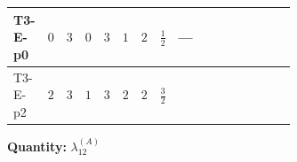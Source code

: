 \documentclass[8pt]{article}
\begin{document}
\begin{landscape}
\begin{longtable}{@{}llcccccc >{\raggedright\arraybackslash}p{0.21\linewidth} >{\raggedright\arraybackslash}p{0.21\linewidth} >{\raggedright\arraybackslash}p{0.21\linewidth}@{}}
\midrule
T3-E-p0 & $0$ & $3$ & $0$ & $3$ & $1$ & $2$ & $\frac{1}{2}$ & --- & \scriptsize\adjustbox{max width=\linewidth}{$\begin{gathered} -24 {g_2}^2 {\lambda_{12}^{(A)}}\end{gathered}$} & \scriptsize\adjustbox{max width=\linewidth}{$\begin{gathered} +8 {\lambda_{12}^{(1)}} {\lambda_{12}^{(A)}}\end{gathered}$} \\
\midrule
T3-E-p2 & $2$ & $3$ & $1$ & $3$ & $2$ & $2$ & $\frac{3}{2}$ & \scriptsize\adjustbox{max width=\linewidth}{$\begin{gathered} +{g_1}^2 \left(16 {g_2}^2-30 {\lambda_{12}^{(A)}}\right)\end{gathered}$} & \scriptsize\adjustbox{max width=\linewidth}{$\begin{gathered} -24 {g_2}^2 {\lambda_{12}^{(A)}}\end{gathered}$} & \scriptsize\adjustbox{max width=\linewidth}{$\begin{gathered} +8 {\lambda_{12}^{(1)}} {\lambda_{12}^{(A)}}\end{gathered}$} \\
\midrule
\bottomrule
\end{longtable}
\clearpage
\noindent\textbf{Quantity: }$\lambda_{12}^{(A)}$\par\smallskip

\end{landscape}
\end{document}

